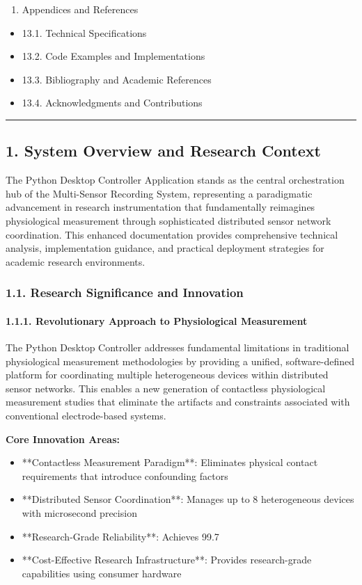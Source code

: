 \documentclass[11pt,a4paper]{article}
\begin{document}
\begin{enumerate}
\item Appendices and References
\end{enumerate}
\begin{itemize}
\item 13.1. Technical Specifications
\item 13.2. Code Examples and Implementations
\item 13.3. Bibliography and Academic References
\item 13.4. Acknowledgments and Contributions

\end{itemize}
\hrule

\subsection{1. System Overview and Research Context}

The Python Desktop Controller Application stands as the central orchestration hub of the Multi-Sensor Recording System,
representing a paradigmatic advancement in research instrumentation that fundamentally reimagines physiological
measurement through sophisticated distributed sensor network coordination. This enhanced documentation provides
comprehensive technical analysis, implementation guidance, and practical deployment strategies for academic research
environments.

\subsubsection{1.1. Research Significance and Innovation}

\paragraph{1.1.1. Revolutionary Approach to Physiological Measurement}

The Python Desktop Controller addresses fundamental limitations in traditional physiological measurement methodologies
by providing a unified, software-defined platform for coordinating multiple heterogeneous devices within distributed
sensor networks. This enables a new generation of contactless physiological measurement studies that eliminate the
artifacts and constraints associated with conventional electrode-based systems.

\textbf{Core Innovation Areas:}

\begin{itemize}
\item **Contactless Measurement Paradigm**: Eliminates physical contact requirements that introduce confounding factors
\item **Distributed Sensor Coordination**: Manages up to 8 heterogeneous devices with microsecond precision
\item **Research-Grade Reliability**: Achieves 99.7%
\item **Cost-Effective Research Infrastructure**: Provides research-grade capabilities using consumer hardware

\end{itemize}
\end{document}
